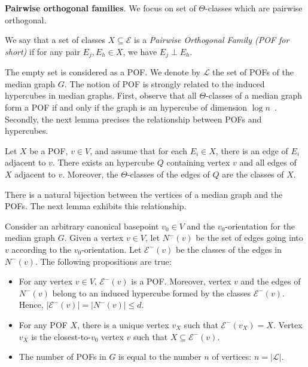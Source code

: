 \documentclass[a4paper,UKenglish,numberwithinsect,cleveref, autoref]{lipics-v2021}
\newcommand{\card}[1]{\left| #1 \right|}
\begin{document}
\textbf{Pairwise orthogonal families}. We focus on set of $\Theta$-classes which are pairwise orthogonal.

\begin{definition}
We say that a set of classes $X \subseteq \mathcal{E}$ is a {\em Pairwise Orthogonal Family (POF for short)} if for any pair $E_j,E_h \in X$, we have $E_j \perp E_h$.
\end{definition}

The empty set is considered as a POF. We denote by $\mathcal{L}$ the set of POFs of the median graph $G$. The notion of POF is strongly related to the induced hypercubes in median graphs. First, observe that all $\Theta$-classes of a median graph form a POF if and only if the graph is an hypercube of dimension $\log n$~\cite{Ko09,MoMuRo98}. Secondly, the next lemma precises the relationship  between POFs and hypercubes.


\begin{lemma}
Let $X$ be a POF, $v \in V$, and assume that for each $E_i \in X$, there is an edge of $E_i$ adjacent to $v$. There exists an hypercube $Q$ containing vertex $v$ and all edges of $X$ adjacent to $v$. Moreover, the $\Theta$-classes of the edges of $Q$ are the classes of $X$.
\label{le:pof_adjacent}
\end{lemma}

There is a natural bijection between the vertices of a median graph and the POFs. The next lemma exhibits this relationship.

\begin{lemma}
Consider an arbitrary canonical basepoint $v_0 \in V$ and the $v_0$-orientation for the median graph $G$. Given a vertex $v \in V$, let $N^-(v)$ be the set of edges going into $v$ according to the $v_0$-orientation. Let $\mathcal{E}^-(v)$ be the classes of the edges in $N^-(v)$. The following propositions are true:
\begin{itemize}
\item For any vertex $v\in V$, $\mathcal{E}^-(v)$ is a POF. Moreover, vertex $v$ and the edges of $N^-(v)$ belong to an induced hypercube formed by the classes $\mathcal{E}^-(v)$. Hence, $\card{\mathcal{E}^-(v)} = \card{N^-(v)} \le d$.
\item For any POF $X$, there is a unique vertex $v_X$ such that $\mathcal{E}^-(v_X) = X$. Vertex $v_X$ is the closest-to-$v_0$ vertex $v$ such that $X \subseteq \mathcal{E}^-(v)$.
\item The number of POFs in $G$ is equal to the number $n$ of vertices: $n = \card{\mathcal{L}}$.
\end{itemize}
\label{le:pof_hypercube}
\end{lemma}
\end{document}
